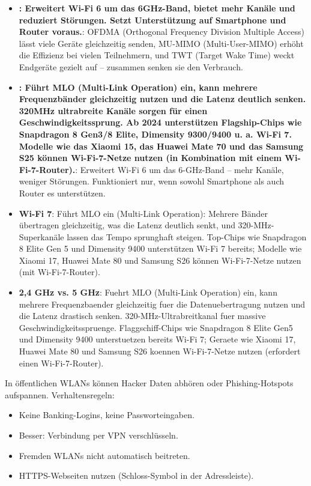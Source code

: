 \begin{itemize}
  \item \textbf{: Erweitert Wi-Fi 6 um das 6GHz-Band, bietet mehr Kanäle und reduziert Störungen. Setzt Unterstützung auf Smartphone und Router voraus.}: OFDMA (Orthogonal Frequency Division Multiple Access) lässt viele Geräte gleichzeitig senden, MU-MIMO (Multi-User-MIMO) erhöht die Effizienz bei vielen Teilnehmern, und TWT (Target Wake Time) weckt Endgeräte gezielt auf – zusammen senken sie den Verbrauch.
  \item \textbf{: Führt MLO (Multi-Link Operation) ein, kann mehrere Frequenzbänder gleichzeitig nutzen und die Latenz deutlich senken. 320MHz ultrabreite Kanäle sorgen für einen Geschwindigkeitssprung. Ab 2024 unterstützen Flagship-Chips wie Snapdragon 8 Gen3/8 Elite, Dimensity 9300/9400 u. a. Wi-Fi 7. Modelle wie das Xiaomi 15, das Huawei Mate 70 und das Samsung S25 können Wi-Fi-7-Netze nutzen (in Kombination mit einem Wi-Fi-7-Router).}: Erweitert Wi-Fi 6 um das 6-GHz-Band – mehr Kanäle, weniger Störungen. Funktioniert nur, wenn sowohl Smartphone als auch Router es unterstützen.
  \item \textbf{Wi-Fi 7}: Führt MLO ein (Multi-Link Operation): Mehrere Bänder übertragen gleichzeitig, was die Latenz deutlich senkt, und 320-MHz-Superkanäle lassen das Tempo sprunghaft steigen. Top-Chips wie Snapdragon 8 Elite Gen 5 und Dimensity 9400 unterstützen Wi-Fi 7 bereits; Modelle wie Xiaomi 17, Huawei Mate 80 und Samsung S26 können Wi-Fi-7-Netze nutzen (mit Wi-Fi-7-Router).
  \item \textbf{2,4 GHz vs. 5 GHz}: Fuehrt MLO (Multi-Link Operation) ein, kann mehrere Frequenzbaender gleichzeitig fuer die Datenuebertragung nutzen und die Latenz drastisch senken. 320-MHz-Ultrabreitkanal fuer massive Geschwindigkeitsspruenge. Flaggschiff-Chips wie Snapdragon 8 Elite Gen5 und Dimensity 9400 unterstuetzen bereits Wi-Fi 7; Geraete wie Xiaomi 17, Huawei Mate 80 und Samsung S26 koennen Wi-Fi-7-Netze nutzen (erfordert einen Wi-Fi-7-Router).
\end{itemize}


In öffentlichen WLANs können Hacker Daten abhören oder Phishing-Hotspots aufspannen. Verhaltensregeln:

\begin{itemize}
  \item Keine Banking-Logins, keine Passworteingaben.
  \item Besser: Verbindung per VPN verschlüsseln.
  \item Fremden WLANs nicht automatisch beitreten.
  \item HTTPS-Webseiten nutzen (Schloss-Symbol in der Adressleiste).
\end{itemize}

